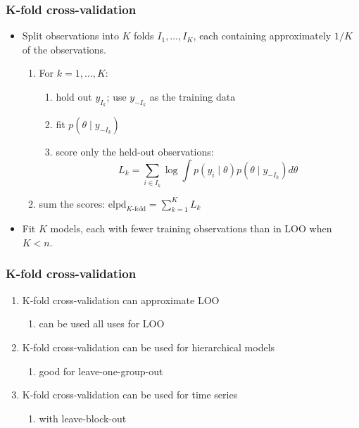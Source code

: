 \documentclass[10pt]{beamer}
\begin{document}
\begin{frame}{}

\frametitle{K-fold cross-validation}

\begin{itemize}
\item Split observations into $K$ folds $I_1,\ldots,I_K$, each containing
  approximately $1/K$ of the observations.
\pause
\begin{enumerate}
\item For $k=1,\ldots,K$:
  \begin{enumerate}
  \item hold out $y_{I_k}$; use $y_{-I_k}$ as the training data
  \item fit $p(\theta\mid y_{-I_k})$
  \item score only the held-out observations:
    \[
      L_k=\sum_{i\in I_k}\log\int p(y_i\mid\theta)p(\theta\mid y_{-I_k})d\theta
    \]
  \end{enumerate}
\item sum the scores: $\text{elpd}_{K\text{-fold}}=\sum_{k=1}^K L_k$
\end{enumerate}
\pause
\item Fit $K$ models, each with fewer training observations than in LOO
  when $K<n$.
\end{itemize}

\end{frame}

\begin{frame}{}

\frametitle{K-fold cross-validation}

\begin{enumerate}
\item K-fold cross-validation can approximate LOO
  \begin{enumerate}
    \item can be used all uses for LOO
  \end{enumerate}
\item K-fold cross-validation can be used for hierarchical models
  \begin{enumerate}
    \item good for leave-one-group-out
  \end{enumerate}
\item K-fold cross-validation can be used for time series
  \begin{enumerate}
    \item with leave-block-out
  \end{enumerate}
\end{enumerate}

\end{frame}
\end{document}

